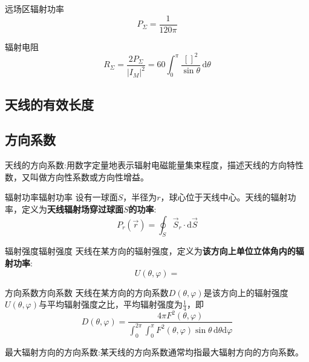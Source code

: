         远场区辐射功率
        \begin{equation}
            P_\Sigma=\frac{1}{120\pi}
        \end{equation}

        辐射电阻
        \begin{equation}
            R_\Sigma=\frac{2P_\Sigma}{|I_M|^2}=60 \int_{0}^{\pi}\frac{[]^2}{\sin\theta}\,\mathrm{d}\theta
        \end{equation}

    \subsection{天线的有效长度}
    \subsection{方向系数}
        天线的方向系数:用数字定量地表示辐射电磁能量集束程度，描述天线的方向特性数，又叫做方向性系数或方向性增益。
        
        
        \begin{definition}{辐射功率}{辐射功率}
            设有一球面$S$，半径为$r$，球心位于天线中心。天线的辐射功率，定义为\textbf{天线辐射场穿过球面$S$的功率}:
            \begin{equation}
                P_r(\vec{r})
                =\oint_S \vec{S}_r\cdot\mathrm{d}\vec{S}
            \end{equation}
        \end{definition}

        \begin{definition}{辐射强度}{辐射强度}
            天线在某方向的辐射强度，定义为\textbf{该方向上单位立体角内的辐射功率}:
            \begin{equation}
                U(\theta,\varphi)=
            \end{equation}
        \end{definition}

        \begin{definition}{方向系数}{方向系数}
            天线在某方向的方向系数$D(\theta,\varphi)$是该方向上的辐射强度$U(\theta,\varphi)$与平均辐射强度之比，平均辐射强度为$\frac{1}{4}$，即
            \begin{equation}
                D(\theta,\varphi)=\frac{4\pi F^2(\theta,\varphi)}{\int_{0}^{2\pi}\int_{0}^{\pi}F^2(\theta,\varphi)\sin\theta\,\mathrm{d}\theta\mathrm{d}\varphi}
            \end{equation}

            最大辐射方向的方向系数:某天线的方向系数通常均指最大辐射方向的方向系数。

        \end{definition}

